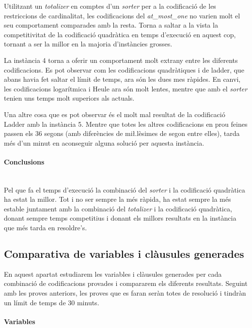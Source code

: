 \documentclass[11pt,a4paper,twoside]{report}
\begin{document}
  Utilitzant un \textit{totalizer} en comptes d'un \textit{sorter} per a la codificació de les restriccions de cardinalitat, les codificacions del \textit{at\_most\_one} no varien molt el seu comportament comparades amb la resta.
  Torna a saltar a la vista la competitivitat de la codificació quadràtica en temps d'execució en aquest cop, tornant a ser la millor en la majoria d'instàncies grosses. 

  La instància 4 torna a oferir un comportament molt extrany entre les diferents codificacions. Es pot observar com les codificacions quadràtiques i de ladder, que abans havia fet saltar el límit de temps, 
  ara són les dues mes ràpides. En canvi, les codificacions logarítmica i Heule ara són molt lentes, mentre que amb el \textit{sorter} tenien uns temps molt superiors als actuals.

  Una altre cosa que es pot observar és el molt mal resultat de la codificació Ladder amb la instància 5. Mentre que totes les altres codificacions en prou feines passen els 36 segons 
  (amb diferències de mi\l.lèsimes de segon entre elles), tarda més d'un minut en aconseguir alguna solució per aquesta instància.

  \paragraph*{Conclusions} ~\\

  Pel que fa el temps d'execució la combinació del \textit{sorter} i la codificació quadràtica ha estat la millor.
   Tot i no ser sempre la més ràpida, ha estat sempre la més estable juntament amb la combinació del \textit{totalizer} 
   i la codificació quadràtica, donant sempre temps competitius i donant els millors resultats en la instància que més tarda en resoldre's.

  

  \subsection{Comparativa de variables i clàusules generades}

  En aquest apartat estudiarem les variables i clàusules generades per cada combinació de codificacions provades i compararem els diferents resultats. Seguint amb les proves anteriors, les proves que es faran seràn totes de resolució i tindràn un límit de temps de 30 minuts.
  
  \paragraph*{Variables} ~\\
\end{document}

